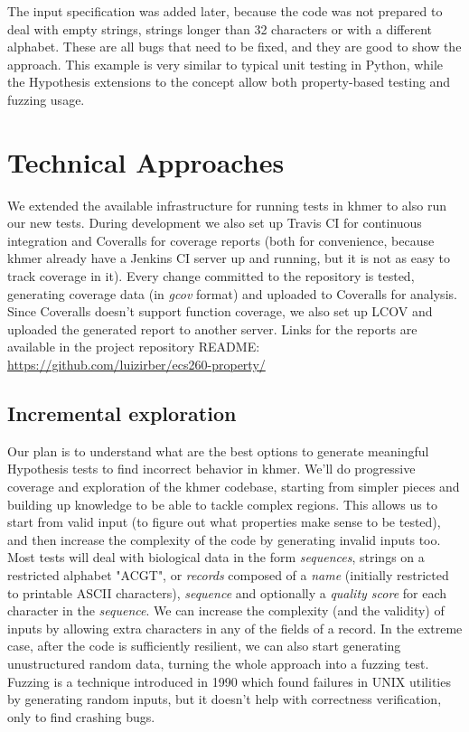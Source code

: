 \documentclass[preprint,nocopyrightspace]{sig-alternate}
\begin{document}
The input specification was added later,
because the code was not prepared to deal with empty strings,
strings longer than 32 characters or with a different alphabet.
These are all bugs that need to be fixed,
and they are good to show the approach.
This example is very similar to typical unit testing in Python,
while the Hypothesis extensions to the concept allow both property-based testing and fuzzing usage.

\section{Technical Approaches}

We extended the available infrastructure for running tests in khmer to also run our new tests.
During development we also set up Travis CI for continuous integration and Coveralls for coverage reports
(both for convenience,
because khmer already have a Jenkins CI server up and running,
but it is not as easy to track coverage in it).
Every change committed to the repository is tested,
generating coverage data (in \emph{gcov} format) and uploaded to Coveralls for analysis.
Since Coveralls doesn't support function coverage,
we also set up LCOV and uploaded the generated report to another server.
Links for the reports are available in the project repository README:
\url{https://github.com/luizirber/ecs260-property/}

\subsection{Incremental exploration}
Our plan is to understand what are the best options to generate meaningful Hypothesis tests to find incorrect behavior in khmer.
We'll do progressive coverage and exploration of the khmer codebase,
starting from simpler pieces and building up knowledge to be able to tackle complex regions.
This allows us to start from valid input (to figure out what properties make sense to be tested),
and then increase the complexity of the code by generating invalid inputs too.
Most tests will deal with biological data in the form \emph{sequences},
strings on a restricted alphabet "ACGT",
or \emph{records} composed of a \emph{name} (initially restricted to printable ASCII characters), \emph{sequence} and optionally a \emph{quality score} for each character in the \emph{sequence}.
We can increase the complexity (and the validity) of inputs by allowing extra characters in any of the fields of a record.
In the extreme case,
after the code is sufficiently resilient,
we can also start generating unustructured random data,
turning the whole approach into a fuzzing test.
Fuzzing \citet{qi2013research} is a technique introduced in 1990 which found failures in UNIX utilities by generating random inputs,
but it doesn't help with correctness verification,
only to find crashing bugs.
\end{document}

